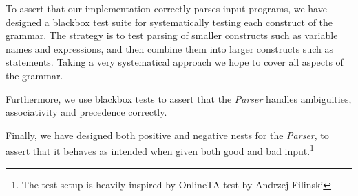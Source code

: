 To assert that our implementation correctly parses input programs, we have designed a blackbox test suite for systematically testing each construct of the grammar.
The strategy is to test parsing of smaller constructs such as variable names and expressions, and then combine them into larger constructs such as statements.
Taking a very systematical approach we hope to cover all aspects of the grammar.

Furthermore, we use blackbox tests to assert that the \textit{Parser} handles ambiguities, associativity and precedence correctly.

Finally, we have designed both positive and negative nests for the \textit{Parser}, to assert that it behaves as intended when given both good and bad input.\footnote{The test-setup is heavily inspired by OnlineTA test by Andrzej Filinski}
